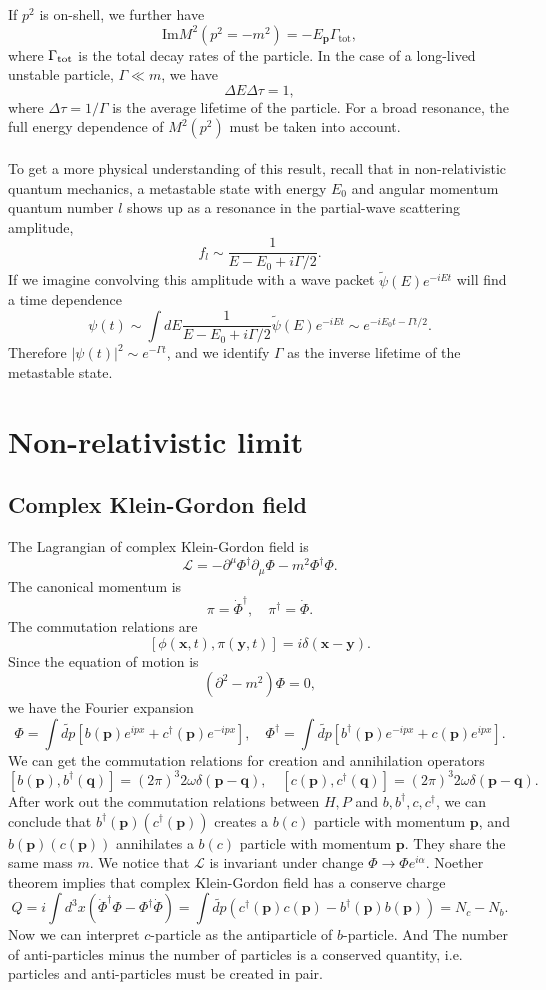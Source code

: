 If $p^2$ is on-shell, we further have
\[\mathrm{Im} M^2(p^2 = -m^2) = -E_{\bm{p}}\Gamma_{\mathrm{tot}},\]
where $\Gamma_{\rm tot}$ is the total decay rates of the particle.
In the case of a long-lived unstable particle, $\Gamma \ll m$, we have
\[\Delta E \Delta \tau = 1,\]
where $\Delta \tau = 1/\Gamma$ is the average lifetime of the particle.  
For a broad resonance, the full energy dependence of $M^2(p^2)$ must be taken into account.
\\ \\
To get a more physical understanding of this result, recall that in non-relativistic quantum mechanics, a metastable state with energy $E_0$ and angular momentum quantum number $l$ shows up as a resonance in the partial-wave scattering amplitude,
\[f_l \sim \frac{1}{E - E_0 + i\Gamma/2}.\]
If we imagine convolving this amplitude with a wave packet $\tilde{\psi}(E)e^{-iEt}$ will find a time dependence
\[\psi(t) \sim \int dE \frac{1}{E-E_0+i\Gamma/2} \tilde{\psi}(E)e^{-iEt} \sim e^{-iE_0 t - \Gamma t /2}.\]
Therefore $|\psi(t)|^2 \sim e^{-\Gamma t}$, and we identify $\Gamma$ as the inverse lifetime of the metastable state.

\section{Non-relativistic limit}
\subsection{Complex Klein-Gordon field}
The Lagrangian of complex Klein-Gordon field is
\[\mathcal{L} = - \partial^{\mu}\Phi^{\dagger}\partial_{\mu}\Phi - m^2\Phi^{\dagger}\Phi.\]
The canonical momentum is
\[\pi = \dot{\Phi}^{\dagger} , \quad \pi^{\dagger} = \dot{\Phi}.\]
The commutation relations are
\[[\phi(\bm{x},t),\pi(\bm{y},t)] = i\delta(\bm{x}-\bm{y}).\]
Since the equation of motion is
\[(\partial^2-m^2)\Phi = 0,\]
we have the Fourier expansion
\[\Phi = \int \widetilde{dp} [b(\bm{p})e^{ipx} + c^{\dagger}(\bm{p})e^{-ipx}] , \quad \Phi^{\dagger} = \int \widetilde{dp} [b^{\dagger}(\bm{p})e^{-ipx} + c(\bm{p})e^{ipx}].\]
We can get the commutation relations for creation and annihilation operators
\[[b(\bm{p}), b^{\dagger}(\bm{q})] = (2\pi)^3 2\omega \delta(\bm{p}-\bm{q}) , \quad [c(\bm{p}), c^{\dagger}(\bm{q})] = (2\pi)^3 2\omega \delta(\bm{p}-\bm{q}).\]
After work out the commutation relations between $H,P$ and $b,b^{\dagger},c,c^{\dagger}$, we can conclude that $b^{\dagger}(\bm{p})(c^{\dagger}(\bm{p}))$ creates a $b(c)$ particle with momentum $\bm{p}$, and $b(\bm{p})(c(\bm{p}))$ annihilates a $b(c)$ particle with momentum $\bm{p}$. They share the same mass $m$.
We notice that $\mathcal{L}$ is invariant under change $\Phi \to \Phi e^{i\alpha}$. Noether theorem implies that complex Klein-Gordon field has a conserve charge
\[Q = i\int d^3x (\dot{\Phi}^{\dagger}\Phi - \Phi^{\dagger}\dot{\Phi}) = \int \widetilde{dp} (c^{\dagger}(\bm{p})c(\bm{p}) - b^{\dagger}(\bm{p})b(\bm{p})) = N_c - N_b.\]
Now we can interpret $c$-particle as the antiparticle of $b$-particle. And The number of anti-particles minus the number of particles is a conserved quantity, i.e. particles and anti-particles must be created in pair.

